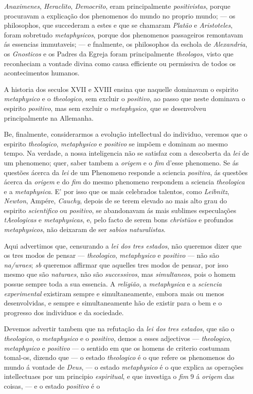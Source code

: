 \emph{Anaximenes}, \emph{Heraclito}, \emph{Democrito}, eram principalmente \emph{positivistas}, porque procuravam a explicação dos phenomenos do mundo no proprio mundo; --- os philosophos, que succederam a estes e que se chamaram \emph{Platão} e \emph{Aristoteles}, foram sobretudo \emph{metaphysicos}, porque dos phenomenos passageiros remontavam ás essencias immutaveis; --- e fnalmente, os philosophos da eschola de \emph{Alexandria}, os \emph{Gnosticos} e os Padres da Egreja foram principalmente \emph{theologos}, visto que reconheciam a vontade divina como causa efficiente ou permissiva de todos os acontecimentos humanos.\par A historia dos seculos XVII e XVIII ensina que naquelle dominavam o espirito \emph{metaphysico} e o \emph{theologico}, sem excluir o \emph{positivo}, ao passo que neste dominava o espirito \emph{positivo}, mas sem excluir o \emph{metaphysico}, que se desenvolveu principalmente na Allemanha.\par Be, finalmente, considerarmos a evolução intellectual do individuo, veremos que o espirito \emph{theologico}, \emph{metaphysico} e \emph{positivo} se impõem e dominam ao mesmo tempo. Na verdade, a nossa inteligencia não se satisfaz com a descoberta da \emph{lei} de um phenomeno; quer, saber tambem a \emph{origem} e o \emph{fim} d'esse phenomeno. Se ás questões ácerca da \emph{lei} de um Phenomeno responde a sciencia \emph{positiva}, ás questões ácerca da \emph{origem} e do \emph{fim} do mesmo phenomeno respondem a sciencia \emph{theologica} e a \emph{metaphysica}. E' por isso que os mais celebrados talentos, como \emph{Leibnitz}, \emph{Newton}, Ampére, \emph{Cauchy}, depois de se terem elevado ao mais alto grau do espirito \emph{scientifico} ou \emph{positivo}, se abandonavam ás mais sublimes especulações \emph{tAeologicas} e \emph{metaphysicas}, e, pelo facto de serem bons \emph{christüos} e profundos \emph{metaphysicos}, não deixaram de ser \emph{sabios naturalistas}.\par Aqui advertimos que, censurando a \emph{lei dos tres estados}, não queremos dizer que os tres modos de pensar --- \emph{theologico}, \emph{metaphysico} e \emph{positivo} --- não são \emph{na/wraes}; \emph{sb} queremos affirmar que aquelles tres modos de pensar, por isso mesmo que são \emph{naturaes}, não são \emph{successivos}, mas \emph{simultaneos}, pois o homem possue sempre toda a sua essencia. A \emph{religião}, a \emph{metaphysica} e a \emph{sciencia experimental} existiram sempre e simultaneamente, embora mais ou menos desenvolvidas, e sempre e simultaneamente hão de existir para o bem e o progresso dos individuos e da sociedade.\par Devemos advertir tambem que na refutação da \emph{lei dos tres estados}, que são o \emph{theologico}, o \emph{metaphysico} e o \emph{positivo}, demos a esses adjectivos --- \emph{theologico}, \emph{metaphysico} e \emph{positivo} --- o sentido em que os homens de criterio costumam tomal-os, dizendo que --- o estado \emph{theologico} é o que refere os phenomenos do mundo á vontade de \emph{Deus}, --- o estado \emph{metaphysico} é o que explica as operações intellectuaes por um principio \emph{espiritual}, e que investiga o \emph{fim} 9 á \emph{origem} das coisas, --- e o estado \emph{positivo} é o 